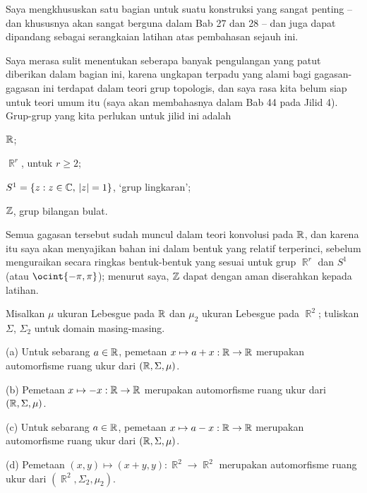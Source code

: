 
\def\chaptername{Ukuran produk}
\def\sectionname{Konvolusi fungsi}


Saya mengkhususkan satu bagian untuk suatu konstruksi yang sangat penting -- dan
khususnya akan sangat berguna dalam Bab 27 dan 28 -- dan juga dapat
dipandang sebagai serangkaian latihan atas pembahasan sejauh ini.

Saya merasa sulit menentukan seberapa banyak pengulangan yang patut diberikan dalam
bagian ini, karena ungkapan terpadu yang alami bagi gagasan-gagasan ini terdapat dalam
teori grup
topologis, dan saya rasa kita belum siap untuk teori umum itu (saya
akan membahasnya dalam Bab 44 pada Jilid 4).   Grup-grup yang kita perlukan untuk jilid ini adalah

\qquad $\Bbb R$;

\qquad $\BbbR^r$, untuk $r\ge 2$;

\qquad $S^1=\{z:z\in\Bbb C,\,|z|=1\}$, `grup lingkaran';

\qquad $\Bbb Z$, grup bilangan bulat.

\noindent Semua gagasan tersebut sudah muncul dalam teori konvolusi pada
$\Bbb R$, dan karena itu saya akan menyajikan bahan ini dalam bentuk yang relatif
terperinci, sebelum menguraikan secara ringkas bentuk-bentuk yang sesuai untuk grup
$\BbbR^r$ dan $S^1$ (atau $\ocint{-\pi,\pi}$);  menurut saya, $\Bbb Z$ dapat
dengan aman diserahkan kepada latihan.

 Misalkan $\mu$ ukuran Lebesgue pada $\Bbb R$ dan
$\mu_2$ ukuran Lebesgue pada $\BbbR^2$;  tuliskan $\Sigma$, $\Sigma_2$ untuk
domain masing-masing.

(a) Untuk sebarang $a\in\Bbb R$, pemetaan $x\mapsto a+x:\Bbb R\to\Bbb R$ merupakan
automorfisme ruang ukur dari $(\Bbb R,\Sigma,\mu)$.

(b) Pemetaan $x\mapsto -x:\Bbb R\to\Bbb R$ merupakan automorfisme ruang
ukur dari $(\Bbb R,\Sigma,\mu)$.

(c) Untuk sebarang $a\in\Bbb R$, pemetaan $x\mapsto a-x:\Bbb R\to\Bbb R$ merupakan
automorfisme ruang ukur dari $(\Bbb R,\Sigma,\mu)$.

(d) Pemetaan $(x,y)\mapsto(x+y,y):\BbbR^2\to\BbbR^2$ merupakan automorfisme ruang
ukur dari $(\BbbR^2,\Sigma_2,\mu_2)$.

